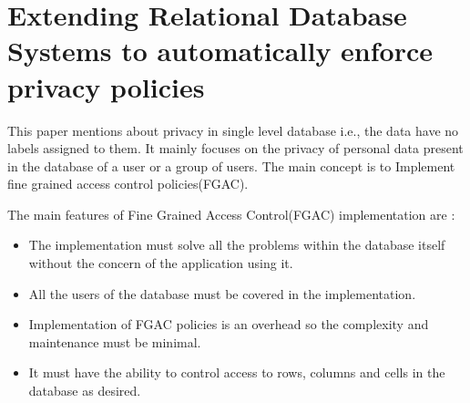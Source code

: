 \documentclass[11pt,a4paper]{report}
\begin{document}
\section{Extending Relational Database Systems to automatically enforce privacy policies}
This paper mentions about privacy in single level database i.e., the data have no labels assigned to them. It mainly focuses on the privacy of personal data present in the database of a user or a group of users. The main concept is to Implement fine grained access control policies(FGAC). 

The main features of Fine Grained Access Control(FGAC) implementation are : 
    \begin{itemize}
        \item The implementation must solve all the problems within the database itself without the concern of the application using it.
        \item All the users of the database must be covered in the implementation.
        \item Implementation of FGAC policies is an overhead so the complexity and maintenance must be minimal.
        \item It must have the ability to control access to rows, columns and cells in the database as desired.
    \end{itemize}
\end{document}

